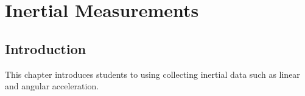 \chapter{Inertial Measurements}

\section{Introduction}
This chapter introduces students to using collecting inertial data such as
linear and angular acceleration.
